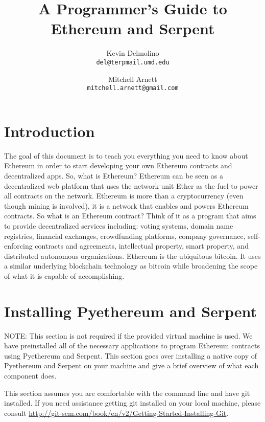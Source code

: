 \documentclass[12pt]{article}
\begin{document}
\title{A Programmer's Guide to Ethereum and Serpent}

\author{
  Kevin Delmolino\\
  \texttt{del@terpmail.umd.edu}
  \and
  Mitchell Arnett\\
  \texttt{mitchell.arnett@gmail.com}
}

\maketitle

\setcounter{tocdepth}{5}
\tableofcontents

\section{Introduction}
The goal of this document is to teach you everything you need to know about Ethereum in order to start developing your own Ethereum contracts and decentralized apps. So, what is Ethereum? Ethereum can be seen as a decentralized web platform that uses the network unit Ether as the fuel to power all contracts on the network. Ethereum is more than a cryptocurrency (even though mining is involved), it is a network that enables and powers Ethereum contracts. So what is an Ethereum contract? Think of it as a program that aims to provide decentralized services including: voting systems, domain name registries, financial exchanges, crowdfunding platforms, company governance, self-enforcing contracts and agreements, intellectual property, smart property, and distributed autonomous organizations. Ethereum is the ubiquitous bitcoin. It uses a similar underlying blockchain technology as bitcoin while broadening the scope of what it is capable of accomplishing. 

\section{Installing Pyethereum and Serpent}
\begin{framed}
NOTE: This section is not required if the provided virtual machine is used. We have preinstalled all of the necessary applications to program Ethereum contracts using Pyethereum and Serpent. This section goes over installing a native copy of Pyethereum and Serpent on your machine and give a brief overview of what each component does.
\end{framed}

This section assumes you are comfortable with the command line and have git installed. If you need assistance getting git installed on your local machine, please consult \url{http://git-scm.com/book/en/v2/Getting-Started-Installing-Git}.
\end{document}
